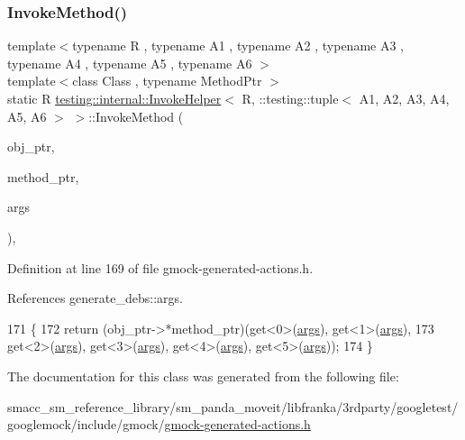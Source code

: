 \subsubsection{\texorpdfstring{Invoke\+Method()}{InvokeMethod()}}
{\footnotesize\ttfamily template$<$typename R , typename A1 , typename A2 , typename A3 , typename A4 , typename A5 , typename A6 $>$ \\
template$<$class Class , typename Method\+Ptr $>$ \\
static R \hyperlink{classtesting_1_1internal_1_1InvokeHelper}{testing\+::internal\+::\+Invoke\+Helper}$<$ R, \+::testing\+::tuple$<$ A1, A2, A3, A4, A5, A6 $>$ $>$\+::Invoke\+Method (\begin{DoxyParamCaption}\item[{Class $\ast$}]{obj\+\_\+ptr,  }\item[{Method\+Ptr}]{method\+\_\+ptr,  }\item[{const \+::testing\+::tuple$<$ A1, A2, A3, A4, A5, A6 $>$ \&}]{args }\end{DoxyParamCaption})\hspace{0.3cm}{\ttfamily [inline]}, {\ttfamily [static]}}



Definition at line 169 of file gmock-\/generated-\/actions.\+h.



References generate\+\_\+debs\+::args.


\begin{DoxyCode}
171                                                                           \{
172            \textcolor{keywordflow}{return} (obj\_ptr->*method\_ptr)(get<0>(\hyperlink{namespacegenerate__debs_a75f9143e38df82d83b2e8a6f99cae02c}{args}), get<1>(\hyperlink{namespacegenerate__debs_a75f9143e38df82d83b2e8a6f99cae02c}{args}),
173                get<2>(\hyperlink{namespacegenerate__debs_a75f9143e38df82d83b2e8a6f99cae02c}{args}), get<3>(\hyperlink{namespacegenerate__debs_a75f9143e38df82d83b2e8a6f99cae02c}{args}), get<4>(\hyperlink{namespacegenerate__debs_a75f9143e38df82d83b2e8a6f99cae02c}{args}), get<5>(\hyperlink{namespacegenerate__debs_a75f9143e38df82d83b2e8a6f99cae02c}{args}));
174   \}
\end{DoxyCode}


The documentation for this class was generated from the following file\+:\begin{DoxyCompactItemize}
\item 
smacc\+\_\+sm\+\_\+reference\+\_\+library/sm\+\_\+panda\+\_\+moveit/libfranka/3rdparty/googletest/googlemock/include/gmock/\hyperlink{gmock-generated-actions_8h}{gmock-\/generated-\/actions.\+h}\end{DoxyCompactItemize}
